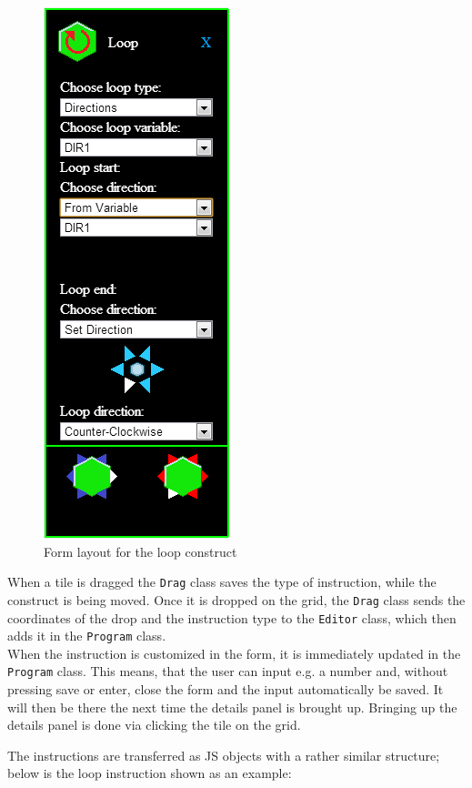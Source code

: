 \begin{figure}[ht]
	\includegraphics[scale=1]{img/editor_loop_form.png}
	\caption{Form layout for the loop construct}
	\label{fig:form_layout}
\end{figure}

When a tile is dragged the \texttt{Drag} class saves the type of instruction, while the construct is being moved.
Once it is dropped on the grid, the \texttt{Drag} class sends the coordinates of the drop and the instruction type to the \texttt{Editor} class, which then adds it in the \texttt{Program} class.\\

When the instruction is customized in the form, it is immediately updated in the \texttt{Program} class.
This means, that the user can input e.g. a number and, without pressing save or enter, close the form and the input automatically be saved.
It will then be there the next time the details panel is brought up.
Bringing up the details panel is done via clicking the tile on the grid.

The instructions are transferred as JS objects with a rather similar structure; below is the loop instruction shown as an example:

